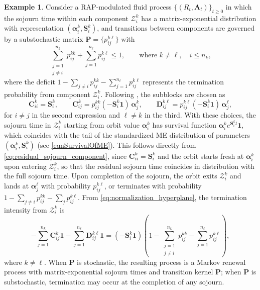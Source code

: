 \documentclass[a4paper,11pt]{article}
\numberwithin{equation}{section}
\theoremstyle{plain}
\theoremstyle{definition}
\newtheorem{example}[theorem]{Example}
\newcommand{\1}{\mathbf{1}}
\begin{document}
\begin{example}\label{ex:ME_renewal}
Consider a RAP-modulated fluid process $\{(R_t, \bm{A}_t)\}_{t \ge 0}$ in which the sojourn time within each component $\mathcal{Z}_i^k$ has a matrix-exponential distribution with representation $(\bm{\alpha}_i^k, \bm{S}_i^k)$, and transitions between components are governed by a substochastic matrix $\bm{P} = \{p_{ij}^{k\ell}\}$ with
\begin{equation}
\sum_{\substack{j=1\\ j\neq i}}^{n_k} p_{ij}^{kk} + \sum_{j=1}^{n_\ell} p_{ij}^{k\ell} \le 1, \qquad \text{where }k\neq\ell, \quad i \le n_k,
\end{equation}
where the deficit $1 - \sum_{j\neq i} p_{ij}^{kk} - \sum_{j=1}^{n_\ell} p_{ij}^{k\ell}$ represents the termination probability from component $\mathcal{Z}_i^k$. Following \cite[Example 3.2]{BeanNguyenNielsenPeralta2022}, the subblocks are chosen as
\begin{equation}\label{eq:ME_renewal_params}
\bm{C}_{ii}^k = \bm{S}_i^k, \qquad \bm{C}_{ij}^k = p_{ij}^{kk}(-\bm{S}_i^k\bm{1})\,\bm{\alpha}_j^k, \qquad \bm{D}_{ij}^{k\ell} = p_{ij}^{k\ell}(-\bm{S}_i^k\bm{1})\,\bm{\alpha}_j^\ell,
\end{equation}
for $i \neq j$ in the second expression and $\ell \neq k$ in the third. With these choices, the sojourn time in $\mathcal{Z}_i^k$ starting from orbit value $\bm{\alpha}_i^k$ has survival function $\bm{\alpha}_i^k e^{\bm{S}_i^k t}\bm{1}$, which coincides with the tail of the standardized ME distribution of parameters $(\bm{\alpha}_i^k, \bm{S}_i^k)$ (see \eqref{eqnSurvivalOfME}). This follows directly from \eqref{eq:residual_sojourn_component}, since $\bm{C}_{ii}^k = \bm{S}_i^k$ and the orbit starts fresh at $\bm{\alpha}_i^k$ upon entering $\mathcal{Z}_i^k$, so that the residual sojourn time coincides in distribution with the full sojourn time.
Upon completion of the sojourn, the orbit exits $\mathcal{Z}_i^k$ and lands at $\bm{\alpha}_j^\ell$ with probability $p_{ij}^{k\ell}$, or terminates with probability $1 - \sum_{j\neq i} p_{ij}^{kk} - \sum_{j} p_{ij}^{k\ell}$.
From \eqref{eq:normalization_hyperplane}, the termination intensity from $\mathcal{Z}_i^k$ is
\[
-\sum_{j=1}^{n_k} \bm{C}_{ij}^k\bm{1} - \sum_{j=1}^{n_\ell} \bm{D}_{ij}^{k\ell}\bm{1} = (-\bm{S}_i^k\bm{1})\left(1-\sum_{\substack{j=1\\ j\neq i}}^{n_k} p_{ij}^{kk}- \sum_{j=1}^{n_\ell}p_{ij}^{k\ell}\right),
\]
where $k\neq\ell$. When $\bm{P}$ is stochastic, the resulting process is a Markov renewal process with matrix-exponential sojourn times and transition kernel $\bm{P}$; when $\bm{P}$ is substochastic, termination may occur at the completion of any sojourn.
\end{example}
\end{document}
